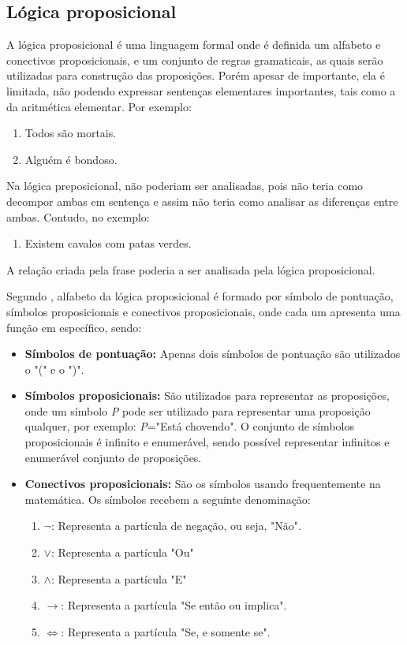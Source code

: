 \subsection{Lógica proposicional}
A lógica proposicional é uma linguagem formal onde é definida um alfabeto e conectivos proposicionais, e um conjunto de regras gramaticais, as quais serão utilizadas para construção das proposições\cite{souza2017logica}. Porém apesar de importante, ela é limitada, não podendo expressar sentenças elementares importantes, tais como a da aritmética elementar. Por exemplo:
\begin{enumerate}
\item Todos são mortais.
\item Alguém é bondoso.
\end{enumerate}
Na lógica preposicional, não poderiam ser analisadas, pois não teria como decompor ambas em sentença e assim não teria como analisar as diferenças entre ambas\cite{abe2002introducao}. Contudo, no exemplo:
\begin{enumerate}
\item Existem cavalos com patas verdes.
\end{enumerate}
A relação criada pela frase poderia  a ser analisada pela lógica proposicional\cite{abe2002introducao}.

Segundo \citeauthor{souza2017logica}, alfabeto da lógica proposicional é formado por símbolo de pontuação, símbolos proposicionais e conectivos proposicionais, onde cada um apresenta uma função em específico, sendo:
\begin{itemize}
\item \textbf{Símbolos de pontuação: }Apenas dois símbolos de pontuação são utilizados o "(" e o ")".
\item \textbf{Símbolos proposicionais:} São utilizados para representar as proposições, onde um símbolo \textit{P} pode ser utilizado para representar uma proposição qualquer, por exemplo: \textit{P}="Está chovendo". O conjunto de símbolos proposicionais é infinito e enumerável, sendo possível representar infinitos e enumerável conjunto de proposições.
\item \textbf{Conectivos proposicionais:} São os símbolos usando frequentemente na matemática. Os símbolos recebem a seguinte denominação: 
\begin{enumerate}
\item \textbf{$\neg$}: Representa a partícula de negação, ou seja, "Não".
\item \textbf{$\lor$}: Representa a partícula "Ou"
\item \textbf{$\land$}: Representa a partícula "E"
\item \textbf{$\rightarrow$}: Representa a partícula "Se então ou implica".
\item \textbf{$\Leftrightarrow$}: Representa a partícula "Se, e somente se".
\end{enumerate} 
\end{itemize}

